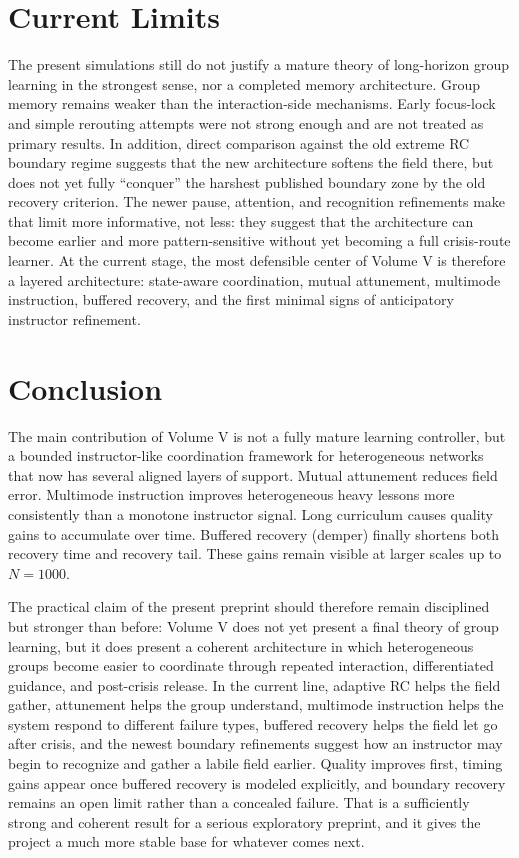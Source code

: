 \documentclass[12pt,a4paper]{article}
\begin{document}
\section{Current Limits}
The present simulations still do not justify a mature theory of long-horizon group learning in the strongest sense, nor a completed memory architecture. Group memory remains weaker than the interaction-side mechanisms. Early focus-lock and simple rerouting attempts were not strong enough and are not treated as primary results. In addition, direct comparison against the old extreme RC boundary regime suggests that the new architecture softens the field there, but does not yet fully ``conquer'' the harshest published boundary zone by the old recovery criterion. The newer pause, attention, and recognition refinements make that limit more informative, not less: they suggest that the architecture can become earlier and more pattern-sensitive without yet becoming a full crisis-route learner. At the current stage, the most defensible center of Volume V is therefore a layered architecture: state-aware coordination, mutual attunement, multimode instruction, buffered recovery, and the first minimal signs of anticipatory instructor refinement.

\section{Conclusion}
The main contribution of Volume V is not a fully mature learning controller, but a bounded instructor-like coordination framework for heterogeneous networks that now has several aligned layers of support. Mutual attunement reduces field error. Multimode instruction improves heterogeneous heavy lessons more consistently than a monotone instructor signal. Long curriculum causes quality gains to accumulate over time. Buffered recovery (demper) finally shortens both recovery time and recovery tail. These gains remain visible at larger scales up to $N=1000$.

The practical claim of the present preprint should therefore remain disciplined but stronger than before: Volume V does not yet present a final theory of group learning, but it does present a coherent architecture in which heterogeneous groups become easier to coordinate through repeated interaction, differentiated guidance, and post-crisis release. In the current line, adaptive RC helps the field gather, attunement helps the group understand, multimode instruction helps the system respond to different failure types, buffered recovery helps the field let go after crisis, and the newest boundary refinements suggest how an instructor may begin to recognize and gather a labile field earlier. Quality improves first, timing gains appear once buffered recovery is modeled explicitly, and boundary recovery remains an open limit rather than a concealed failure. That is a sufficiently strong and coherent result for a serious exploratory preprint, and it gives the project a much more stable base for whatever comes next.
\end{document}
